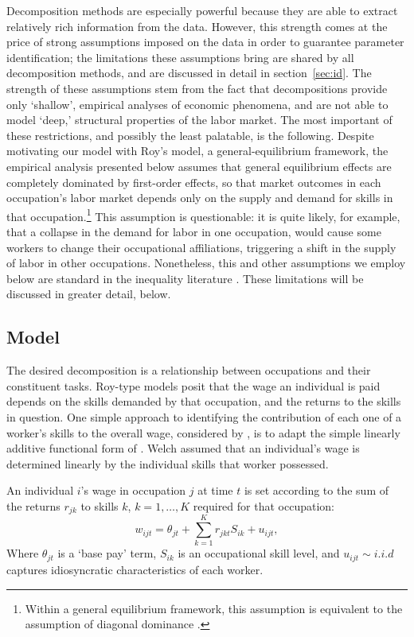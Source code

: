 Decomposition methods are especially powerful because they are able to extract relatively rich information from the data. However, this strength comes at the price of strong assumptions imposed on the data in order to guarantee parameter identification; the limitations these assumptions bring are shared by all decomposition methods, and are discussed in detail in section~\ref{sec:id}. The strength of these assumptions stem from the fact that decompositions provide only `shallow', empirical analyses of economic phenomena, and are not able to model `deep,' structural properties of the labor market. The most important of these restrictions, and possibly the least palatable, is the following. Despite motivating our model with Roy's model, a general-equilibrium framework, the empirical analysis presented below assumes that general equilibrium effects are completely dominated by first-order effects, so that market outcomes in each occupation's labor market depends only on the supply and demand for skills in that occupation.\footnote{Within a general equilibrium framework, this assumption is equivalent to the assumption of diagonal dominance \citep[p.233]{Arrow1971}.} This assumption is questionable: it is quite likely, for example, that a collapse in the demand for labor in one occupation, would cause some workers to change their occupational affiliations, triggering a shift in the supply of labor in other occupations. Nonetheless, this and other assumptions we employ below are standard in the inequality literature \citep[p.1]{Fortin2011}. These limitations will be discussed in greater detail, below.

\subsection{Model}

The desired decomposition is a relationship between occupations and their constituent tasks. Roy-type models posit that the wage an individual is paid depends on the skills demanded by that occupation, and the returns to the skills in question. One simple approach to identifying the contribution of each one of a worker's skills to the overall wage, considered by \citet{Firpo2011}, is to adapt the simple linearly additive functional form of \citet{Welch1969}. Welch assumed that an individual's wage is determined linearly by the individual skills that worker possessed.
\begin{assumption} \label{ass:linear}
  An individual $i$'s wage in occupation $j$ at time $t$ is set according to the sum of the returns $r_{jk}$ to skills $k$, $k=1,\dots,K$ required for that occupation:
\begin{equation}
  w_{ijt} = \theta_{jt} + \sum_{k=1}^K r_{jkt}S_{ik} + u_{ijt}, \label{eq:linear}
\end{equation}
Where $\theta_{jt}$ is a `base pay' term, $S_{ik}$ is an occupational skill level, and $u_{ijt}\sim i.i.d$ captures idiosyncratic characteristics of each worker. 
\end{assumption}

